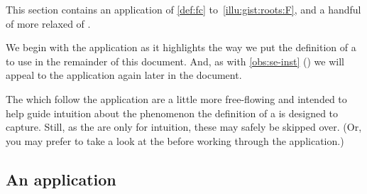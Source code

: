 \begin{note}
  This section contains an application of \autoref{def:fc} to~\autoref{illu:gist:roots:F}, and a handful of more relaxed  of .

  We begin with the application as it highlights the way we put the definition of a \fc{} to use in the remainder of this document.
  And, as with \autoref{obs:se-inst} () we will appeal to the application again later in the document.

  The  which follow the application are a little more free-flowing and intended to help guide intuition about the phenomenon the definition of a \fc{} is designed to capture.
  Still, as the  are only for intuition, these may safely be skipped over.
  (Or, you may prefer to take a look at the  before working through the application.)
\end{note}


\subsection{An application}


